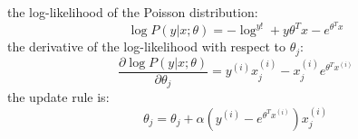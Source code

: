 \begin{answer}
the log-likelihood of the Poisson distribution:
$$\log P(y|x;\theta) = -\log^{y!} + y \theta^T x - e^{\theta^T x}$$
the derivative of the log-likelihood with respect to $\theta_j$:
$$\frac{\partial \log P(y|x;\theta)}{\partial \theta_j} = y^{(i)}x^{(i)}_j - x^{(i)}_je^{\theta^T x^{(i)}}$$
the update rule is:
$$\theta_j = \theta_j + \alpha (y^{(i)} - e^{\theta^T x^{(i)}}) x^{(i)}_j$$
\end{answer}
